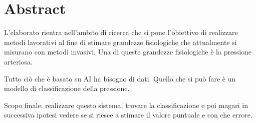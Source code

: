\chapter*{Abstract}
\label{ch:abstract}

L'elaborato rientra nell'ambito di ricerca che si pone l'obiettivo di realizzare metodi lavorativi al fine di stimare grandezze fisiologiche che attualmente si misurano con metodi invasivi. Una di queste grandezze fisiologiche è la pressione arteriosa. 

Tutto ciò che è basato su AI ha bisogno di dati. Quello che si può fare è un modello di classificazione della pressione. 

Scopo finale: realizzare questo sistema, trovare la classificazione e poi magari in successiva ipotesi vedere se si riesce a  stimare il valore puntuale e con che errore. 